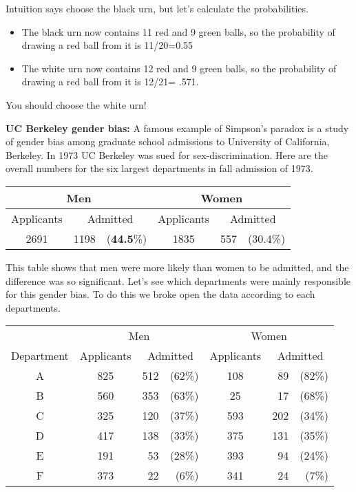 Intuition says choose the black urn, but let's calculate the
probabilities.

\begin{itemize}
\item The black urn now contains 11 red and 9 green balls, so the
  probability of drawing a red ball from it is 11/20=0.55
\item The white urn now contains 12 red and 9 green balls, so the
  probability of drawing a red ball from it is 12/21= .571.
\end{itemize}

You should choose the white urn!

\textbf{UC Berkeley gender bias:} A famous example of Simpson's
paradox is a study of gender bias among graduate school admissions to
University of California, Berkeley. In 1973 UC Berkeley was sued for
sex-discrimination. Here are the overall numbers for the six largest
departments in fall admission of 1973.

\begin{center}
\begin{tabular}{crrcrr}\hline
 \multicolumn{3}{c}{Men} & \multicolumn{3}{c}{Women} \\\hline
 Applicants & \multicolumn{2}{c}{Admitted}     & Applicants & \multicolumn{2}{c}{Admitted} \\\hline
 2691       & 1198 & ({\bf 44.5}\%) & 1835       & 557 & (30.4\%) \\\hline
\end{tabular}
\end{center}

This table shows that men were more likely than women to be admitted,
and the difference was so significant. Let's see which departments
were mainly responsible for this gender bias. To do this we broke open
the data according to each departments.

\begin{center}
\begin{tabular}{ccrrcrr}\hline
  & \multicolumn{3}{c}{Men}  & \multicolumn{3}{c}{Women} \\\cline{2-7}
Department & Applicants  & \multicolumn{2}{c}{Admitted} & Applicants  & \multicolumn{2}{c}{Admitted} \\\hline
A & 825 & 512& (62\%) & 108 & 89 &(82\%)  \\ 
B & 560 & 353& (63\%) & 25  & 17 &(68\%)  \\
C & 325 & 120& (37\%) & 593 & 202& (34\%) \\
D & 417 & 138& (33\%) & 375 & 131& (35\%) \\
E & 191 & 53 & (28\%) & 393 & 94 &(24\%)  \\
F & 373 & 22 & (6\%) & 341 & 24 &(7\%)  \\\hline
\end{tabular}
\end{center}

